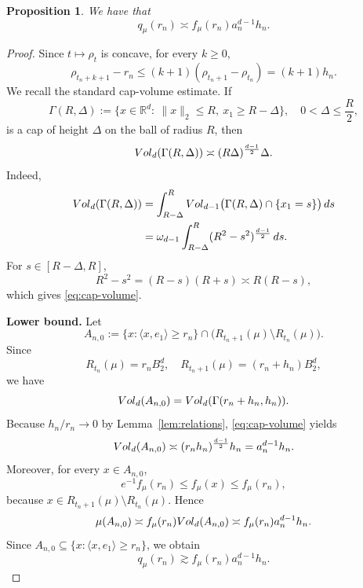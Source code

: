 \documentclass[10pt,a4paper]{amsart}
\newtheorem{proposition}{Proposition}
\newcommand{\vol}{{\rm Vol}}
\begin{document}
\begin{proposition}\label{prop:q-shell-comparison}
We have that
\[
q_\mu(r_n)\asymp f_\mu(r_n)a_n^{d-1}h_n.
\]
\end{proposition}

\begin{proof}
Since \(t\mapsto \rho_t\) is concave, for every \(k\ge 0\),
\begin{equation}\label{eq:rho-concavity-step}
\rho_{t_n+k+1}-r_n
\le (k+1)(\rho_{t_n+1}-\rho_{t_n})
=(k+1)h_n.
\end{equation}
We recall the standard cap-volume estimate. If
\[
\Gamma(R,\Delta):=\{x\in\mathbb R^d:\ \|x\|_2\le R,\ x_1\ge R-\Delta\},
\quad
0<\Delta\le \frac R2,
\]
is a cap of height \(\Delta\) on the ball of radius \(R\), then
\begin{equation}\label{eq:cap-volume}
\vol_d(\Gamma(R,\Delta))
\asymp
(R\Delta)^{\frac{d-1}{2}}\Delta.
\end{equation}
Indeed,
\begin{align*}
\vol_d(\Gamma(R,\Delta))
&=
\int_{R-\Delta}^R
\vol_{d-1}\bigl(\Gamma(R,\Delta)\cap\{x_1=s\}\bigr)\,ds  \\
&=
\omega_{d-1}\int_{R-\Delta}^R
(R^2-s^2)^{\frac{d-1}{2}}\,ds.
\end{align*}
For \(s\in[R-\Delta,R]\),
\[
R^2-s^2=(R-s)(R+s)\asymp R(R-s),
\]
which gives \eqref{eq:cap-volume}.

\medskip

\noindent\textbf{Lower bound.}
Let
\[
A_{n,0}:=
\{x:\langle x,e_1\rangle\ge r_n\}
\cap
\bigl(R_{t_n+1}(\mu)\setminus R_{t_n}(\mu)\bigr).
\]
Since
\[
R_{t_n}(\mu)=r_nB_2^d,
\quad
R_{t_n+1}(\mu)=(r_n+h_n)B_2^d,
\]
we have
\[
\vol_d(A_{n,0})
=
\vol_d(\Gamma(r_n+h_n,h_n)).
\]
Because \(h_n/r_n\to0\) by Lemma~\ref{lem:relations}, \eqref{eq:cap-volume} yields
\begin{equation}\label{eq:vol-lower-shell}
\vol_d(A_{n,0})
\asymp
(r_nh_n)^{\frac{d-1}{2}}h_n
=
a_n^{d-1}h_n.
\end{equation}
Moreover, for every \(x\in A_{n,0}\),
\[
e^{-1}f_\mu(r_n)\le f_\mu(x)\le f_\mu(r_n),
\]
because \(x\in R_{t_n+1}(\mu)\setminus R_{t_n}(\mu)\). Hence
\[
\mu(A_{n,0})
\asymp
f_\mu(r_n)\vol_d(A_{n,0})
\asymp
f_\mu(r_n)a_n^{d-1}h_n.
\]
Since \(A_{n,0}\subseteq \{x:\langle x,e_1\rangle\ge r_n\}\), we obtain
\begin{equation}\label{eq:q-lower}
q_\mu(r_n)\gtrsim f_\mu(r_n)a_n^{d-1}h_n.
\end{equation}



\end{proof}
\end{document}

